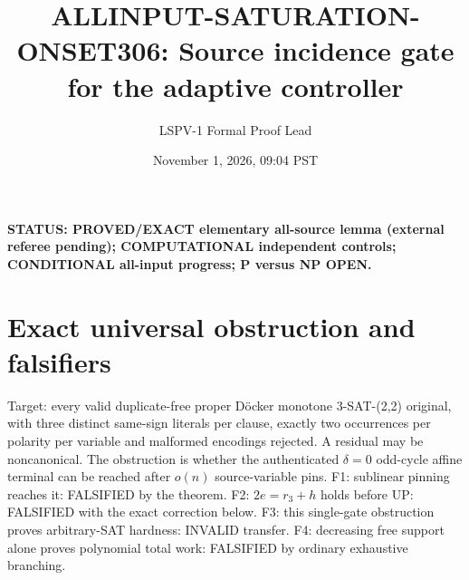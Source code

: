 \documentclass[11pt]{article}
\title{ALLINPUT-SATURATION-ONSET306: Source incidence gate for the adaptive controller}
\author{LSPV-1 Formal Proof Lead}\date{November 1, 2026, 09:04 PST}
\begin{document}
\maketitle
\noindent\textbf{STATUS: PROVED/EXACT elementary all-source lemma (external referee pending); COMPUTATIONAL independent controls; CONDITIONAL all-input progress; P versus NP OPEN.}
\section{Exact universal obstruction and falsifiers}
Target: every valid duplicate-free proper D\"ocker monotone 3-SAT-(2,2) original, with three distinct same-sign literals per clause, exactly two occurrences per polarity per variable and malformed encodings rejected. A residual may be noncanonical. The obstruction is whether the authenticated $\delta=0$ odd-cycle affine terminal can be reached after $o(n)$ source-variable pins.
F1: sublinear pinning reaches it: FALSIFIED by the theorem. F2: $2e=r_3+h$ holds before UP: FALSIFIED with the exact correction below. F3: this single-gate obstruction proves arbitrary-SAT hardness: INVALID transfer. F4: decreasing free support alone proves polynomial total work: FALSIFIED by ordinary exhaustive branching.
\end{document}
